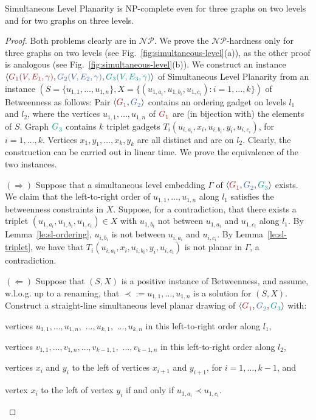 \documentclass{llncs}
\newcommand{\NP}{$\mathcal{NP}$\xspace}
\renewcommand{\NP}{$\mathcal{NP}$}
\newcommand{\NPC}{\mbox{NP-complete}\xspace}
\newcommand{\red}[1]{{\color{red}{#1\xspace}}}
\newcommand{\blue}[1]{{\color{blue}{#1\xspace}}}
\newcommand{\green}[1]{{\color{green}{#1\xspace}}}
\newcommand{\Gr}[1]{$\red{G^{#1}_1}$\xspace}
\newcommand{\Gg}[1]{$\green{G^{#1}_3}$\xspace}
\newcommand{\sefeinstance}[1]{$\langle\red{G^{#1}_1},\blue{G^{#1}_2}\rangle$\xspace}
\newcommand{\sefethreeinstance}[1]{$\langle\red{G^{#1}_1},\blue{G^{#1}_2},\green{G^{#1}_3}\rangle$\xspace}
\begin{document}
\begin{theorem} \label{thm:sim-level-npc-two-levels} {\sc Simultaneous Level Planarity} is \NPC even for three graphs on two levels and for two graphs on three levels.
\end{theorem}
\begin{proof}
Both problems clearly are in \NP. We prove the \NP-hardness only for three graphs on two levels (see Fig.~\ref{fig:simultaneous-level}(a)), as the other proof is analogous (see Fig.~\ref{fig:simultaneous-level}(b)). We construct an instance $\langle \red{G_1(V,E_1,\gamma)},\blue{G_2(V,E_2,\gamma)},\green{G_3(V,E_3,\gamma)} \rangle$ of {\sc Simultaneous Level Planarity} from an instance $(S=\{u_{1,1},\dots,u_{1,n}\},X=\{(u_{1,a_i},u_{1,b_i},u_{1,c_i}):i=1,\dots,k\})$ of {\sc Betweenness} as follows: Pair \sefeinstance{} contains an ordering gadget on levels $l_1$ and $l_2$, where the vertices $u_{1,1},\dots,u_{1,n}$ of \Gr{} are (in bijection with) the elements of $S$. Graph \Gg{} contains $k$ triplet gadgets $T_i(u_{i,a_i},x_i,u_{i,b_i},y_i,u_{i,c_i})$, for $i=1,\dots,k$. Vertices $x_1,y_1,\dots,x_k,y_k$ are all distinct and are on $l_2$. Clearly, the construction can be carried out in linear time.  We prove the equivalence of the two instances. 


$(\Longrightarrow)$ Suppose that a simultaneous level embedding $\Gamma$ of \sefethreeinstance{} exists. We claim that the left-to-right order of $u_{1,1},\dots,u_{1,n}$ along $l_1$ satisfies the betweenness constraints in $X$. Suppose, for a contradiction, that there exists a triplet $(u_{1,a_i},u_{1,b_i},u_{1,c_i})\in X$ with $u_{1,b_i}$ not between $u_{1,a_i}$ and $u_{1,c_i}$ along $l_1$. By Lemma~\ref{le:sl-ordering}, $u_{i,b_i}$ is not between $u_{i,a_i}$ and $u_{i,c_i}$. By Lemma~\ref{le:sl-triplet}, we have that $T_i(u_{i,a_i},x_i,u_{i,b_i},y_i,u_{i,c_i})$ is not planar in  $\Gamma$, a contradiction. 

$(\Longleftarrow)$ Suppose that $(S,X)$ is a positive instance of {\sc Betweenness}, and assume, w.l.o.g. up to a renaming, that $\prec:=u_{1,1},\dots,u_{1,n}$ is a solution for $(S,X)$.
Construct a straight-line simultaneous level planar drawing of \sefethreeinstance{} with:
\begin{inparaenum}[(i)]
\item vertices $u_{1,1},\dots,u_{1,n},$ $\dots, u_{k,1},$ $\dots,u_{k,n}$ in this
  left-to-right order along $l_1$, 
\item  vertices $v_{1,1},\dots,v_{1,n},\dots,v_{k-1,1},$ $\dots,v_{k-1,n}$ in this
  left-to-right order along $l_2$,
\item  vertices $x_i$ and $y_i$ to the left
  of vertices $x_{i+1}$ and $y_{i+1}$, for $i=1,\dots,k-1$, and
\item vertex $x_i$ to the left of vertex $y_i$ if and only if $u_{1,a_i}\prec u_{1,c_i}$.
\end{inparaenum}


\end{proof}
\end{document}

